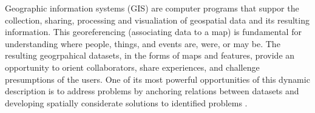 Geographic information systems (GIS) are computer programs that suppor the collection, sharing, processing and visualiation of geospatial data and its resulting information\cite{McQueenBaker2019}. %
This georeferencing (associating data to a map) is fundamental for understanding where people, things, and events are, were, or may be\cite{Xing2015,Rajabifard2009}. %
The resulting geogrpahical datasets, in the forms of maps and features, provide an opportunity to orient collaborators, share experiences, and challenge presumptions of the users\cite{Jiang2020, McQueenBaker2019}.%
One of its most powerful opportunities of this dynamic description is to address problems by anchoring relations between datasets and developing spatially considerate solutions to identified problems \cite{Bhattacharya2018, Rajabifard2009}. %
